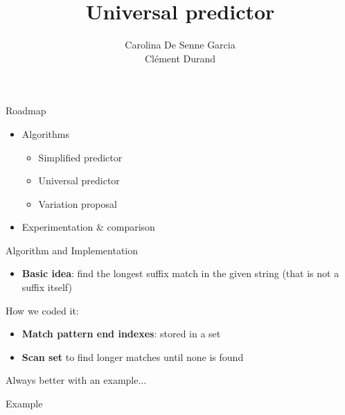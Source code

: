 \documentclass[aspectratio=169]{beamer}
\title[Pattern-based prediction algorithms, applications and variations]
      {Universal predictor}
\author{%
  Carolina De Senne Garcia\\%
  Clément Durand%
}
\begin{document}
\maketitle

\begin{frame}{Roadmap}\Large
  \begin{itemize}
    \item Algorithms
      \begin{itemize}
        \item Simplified predictor
        \item Universal predictor
        \item Variation proposal
      \end{itemize}
    \item Experimentation \& comparison
  \end{itemize}
\end{frame}


\begin{frame}{Algorithm and Implementation}
  \begin{itemize}
    \item \textbf{Basic idea}: find the longest suffix match in the given string (that is not a suffix itself)
  \end{itemize}

  \vspace{\fill}

  How we coded it:
  \begin{itemize}
    \item \textbf{Match pattern end indexes}: stored in a set
    \item \textbf{Scan set} to find longer matches until none is found
  \end{itemize}
  \vspace{\fill}

    Always better with an example...

\end{frame}

\begin{frame}{Example}\centering
  
\end{frame}

\end{document}
